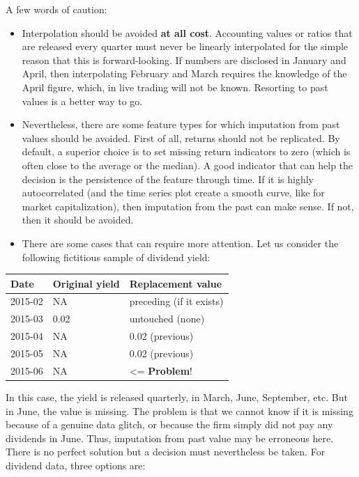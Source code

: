 A few words of caution:

\begin{itemize}
\item Interpolation should be avoided \textbf{at all cost}. Accounting values or ratios that are released every quarter must never be linearly interpolated for the simple reason that this is forward-looking. If numbers are disclosed in January and April, then interpolating February and March requires the knowledge of the April figure, which, in live trading will not be known. Resorting to past values is a better way to go.
\item Nevertheless, there are some feature types for which imputation from past values should be avoided. First of all, returns should not be replicated. By default, a superior choice is to set missing return indicators to zero (which is often close to the average or the median). A good indicator that can help the decision is the persistence of the feature through time. If it is highly autocorrelated (and the time series plot create a smooth curve, like for market capitalization), then imputation from the past can make sense. If not, then it should be avoided.
\item There are some cases that can require more attention. Let us consider the following fictitious sample of dividend yield:
\end{itemize}

\bigskip\noindent
\begin{tabular}{p{}p{}p{}}
\toprule
Date & Original yield & Replacement value \\
\hline
2015-02 & NA & preceding (if it exists) \\
2015-03 & 0.02 & untouched (none) \\
2015-04 & NA & 0.02 (previous) \\
2015-05 & NA & 0.02 (previous) \\
2015-06 & NA & \textless = \textbf{Problem}! \\
\bottomrule
\end{tabular}

\bigskip

In this case, the yield is released quarterly, in March, June, September, etc. But in June, the value is missing. The problem is that we cannot know if it is missing because of a genuine data glitch, or because the firm simply did not pay any dividends in June. Thus, imputation from past value may be erroneous here. There is no perfect solution but a decision must nevertheless be taken. For dividend data, three options are:

